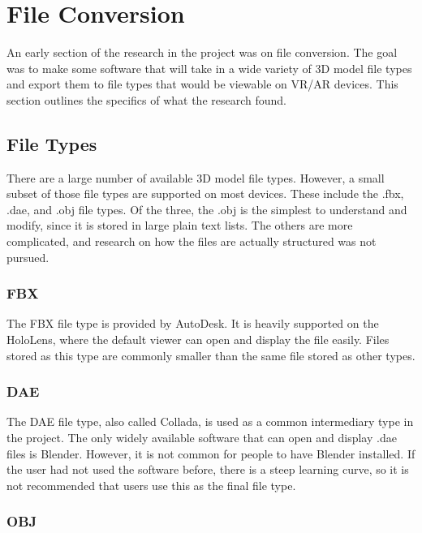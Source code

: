 
\section{File Conversion}

    An early section of the research in the project was on file conversion.  The goal was to make some software that will take in a wide variety of 3D model file types and export them to file types that would be viewable on VR/AR devices.  This section outlines the specifics of what the research found.

    \subsection{File Types}

        There are a large number of available 3D model file types.  However, a small subset of those file types are supported on most devices.  These include the .fbx, .dae, and .obj file types.  Of the three, the .obj is the simplest to understand and modify, since it is stored in large plain text lists.  The others are more complicated, and research on how the files are actually structured was not pursued.

        \subsubsection{FBX}

            The FBX file type is provided by AutoDesk.  It is heavily supported on the HoloLens, where the default viewer can open and display the file easily.  Files stored as this type are commonly smaller than the same file stored as other types.

        \subsubsection{DAE}

            The DAE file type, also called Collada, is used as a common intermediary type in the project.  The only widely available software that can open and display .dae files is Blender.  However, it is not common for people to have Blender installed.  If the user had not used the software before, there is a steep learning curve, so it is not recommended that users use this as the final file type.

        \subsubsection{OBJ}

